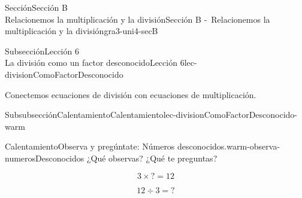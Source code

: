 %
%
\typeout{************************************************}
\typeout{************************************************}
%
\vspace*{-2ex}
\begin{sectionptx}{Sección}{{\Large Sección B\\}Relacionemos la multiplicación y la división}{}{Sección B -~Relacionemos la multiplicación y la división}{}{}{gra3-uni4-secB}
\vspace*{-2ex}
%
%
\typeout{************************************************}
\typeout{************************************************}
%
\begin{subsectionptx}{Subsección}{{\normalsize Lección 6\\[-0.05cm]}La división como un factor desconocido}{}{Lección 6}{}{}{lec-divisionComoFactorDesconocido}
\begin{introduction}{}%
Conectemos ecuaciones de división con ecuaciones de multiplicación.%
\end{introduction}%
%
%
\typeout{************************************************}
\typeout{************************************************}
%
\vspace*{-1.5ex}
\begin{subsubsectionptx}{Subsubsección}{Calentamiento}{}{Calentamiento}{}{}{lec-divisionComoFactorDesconocido-warm}
\begin{exploration}{Calentamiento}{Observa y pregúntate: Números desconocidos.}{warm-observa-numerosDesconocidos}%
¿Qué observas? ¿Qué te preguntas?%
\vspace*{-1.5ex}
\begin{sidebyside}{2}{0}{0}{0}%
\begin{sbspanel}{0.5}%
%
\begin{equation*}
3\times {?} =12
\end{equation*}
%
\end{sbspanel}%
\begin{sbspanel}{0.5}%
\par
%
\begin{equation*}
12\div 3 ={?}
\end{equation*}
%
\end{sbspanel}%
\end{sidebyside}%
\end{exploration}%
\end{subsubsectionptx}

\end{subsectionptx}
\end{sectionptx}
